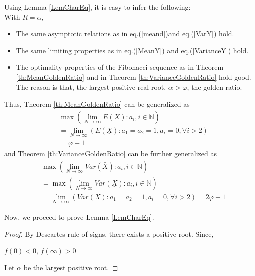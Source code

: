 \begin{multicols}{2}
Using Lemma \ref{LemCharEq}, it is easy to infer the following:\\
With $R = \alpha$,
\begin{itemize}
\item The same asymptotic relations as in eq.(\ref{meand})and eq.(\ref{VarY}) hold. 
\item The same limiting properties as in eq.(\ref{MeanY}) and eq.(\ref{VarianceY}) hold.
\item The optimality properties of the Fibonacci sequence as in Theorem \ref{th:MeanGoldenRatio} and in Theorem \ref{th:VarianceGoldenRatio} hold good. The reason is that, the largest positive real root, $\alpha > \varphi$, the golden ratio.
\end{itemize}
Thus, Theorem \ref{th:MeanGoldenRatio} can be generalized as 
\begin{align*}
&\max{\left(\lim_{N\rightarrow \infty} E(\underline{X}): a_i, i \in \mathbb N \right)}\\
 &= \lim_{N \rightarrow \infty}\left(E(\underline{X}):a_1 = a_2 = 1, a_{i}=0, \forall i> 2\right)\\
   &= \varphi + 1
\end{align*}
and Theorem \ref{th:VarianceGoldenRatio} can be further generalized as 
\begin{align*}
&\max{\left(\lim_{N\rightarrow \infty}Var(\bar{X}): a_i, i \in \mathbb N\right)}\\
&= \max{\left(\lim_{N\rightarrow \infty}Var(\underline{X}): a_i, i \in \mathbb N\right)}\\
\nonumber &= \lim_{N \rightarrow \infty}\left(Var(\underline{X}):a_1=a_2=1, a_{i}=0,\forall i > 2\right) = 2\varphi + 1
\end{align*}

Now, we proceed to prove Lemma \ref{LemCharEq}.
\begin{proof}\renewcommand{\qedsymbol}{} 
By Descartes rule of signs, there exists a positive root. Since, 

\vspace{-.7cm}
 \begin{center}
 $ f(0) < 0$, $f(\infty) > 0$ \\
 \end{center}

\vspace{-.3cm}

Let $\alpha$ be the largest positive root. 

\vspace{-.3cm}


\end{proof}
\end{multicols}
